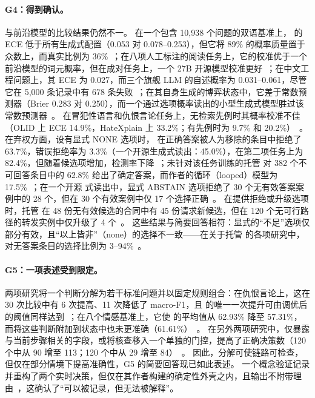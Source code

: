 \paragraph{G4：得到确认。}
与前沿模型的比较结果仍然不一。
在一个包含 10{,}938 个问题的双语基准上，\jev{} 的 ECE 低于所有生成式配置（0.053 对 0.078--0.253），但它将 89\% 的概率质量置于众数上，而真实比例为 36\%~\cite{arx03935}；在八项人工标注的阅读任务上，它的校准优于一个前沿模型的词元概率，但在成对任务上，一个 27B 开源模型校准更好~\cite{arx06625}；在中文工程问题上，其 ECE 为 0.027，而三个旗舰 LLM 的自述概率为 0.031--0.061，尽管它在 5{,}000 条记录中有 678 条失败~\cite{arx09896}；在其自身生成的博弈状态中，它差于常数预测器（Brier 0.283 对 0.250），而一个通过选项概率读出的小型生成式模型胜过该常数预测器~\cite{zen23221456}\zmark{}。
在冒犯性语言和仇恨言论任务上，无检索先例时其概率校准不佳（OLID 上 ECE 14.9\%，HateXplain 上 33.2\%；有先例时为 9.7\% 和 20.2\%）~\cite{arx07953}。
在弃权方面，设有显式 NONE 选项时，\jev{} 在正确答案被人为移除的条目中拒绝了 63.7\%，错误拒绝率为 3.3\%（一个开源生成式读出：45.0\%），在第二项任务上为 82.4\%，但随着候选项增加，检测率下降~\cite{arx03387}；未针对该任务训练的托管 \jev{} 对 382 个不可回答条目中的 62.8\% 给出了确定答案，而作者的循环（looped）模型为 17.5\%~\cite{arx07730}；在一个开源 \jev{} 式读出中，显式 ABSTAIN 选项拒绝了 30 个无有效答案案例中的 28 个，但在 30 个有效案例中仅 17 个选择正确~\cite{arx07327}。
在提供拒绝或升级选项时，托管 \jev{} 在 48 份无有效候选的合同中有 45 份请求新候选，但在 120 个无可行路径的转发实例中仅升级了 4 个~\cite{arx06425}。
这些结果与简要回答相符：显式的“不足”选项仅部分有效，且“以上皆非”（none）的选择不一致——在关于托管 \jev{} 的各项研究中，对无答案条目的选择比例为 3--94\%~\cite{arx39496,arx03387,arx06425}。

\paragraph{G5：一项表述受到限定。}
两项研究将一个判断分解为若干标准问题并以固定规则组合：在仇恨言论上，这在 30 次比较中有 6 次提高、11 次降低了 macro-F1，且 \jev{} 的唯一一次提升可由调优后的阈值同样达到~\cite{arx03324}；在八个情感基准上，它使 \jev{} 的平均值从 62.93\% 降至 57.31\%，而将这些判断附加到状态中也未更准确（61.61\%）~\cite{arx08829}。
在另外两项研究中，仅暴露与当前步骤相关的字段，或将核查移入一个单独的门控，提高了正确决策数（120 个中从 90 增至 113；120 个中从 29 增至 84）~\cite{arx07327,arx06425}。
因此，分解可使链路可检查，但仅在部分情境下提高准确性，G5 的简要回答现已如此表述。
一个概念验证记录并重构了两个实时决策，但仅在其作者构建的确定性外壳之内，且输出不附带理由~\cite{zen23189584}\zmark{}，这确认了“可以被记录，但无法被解释”。

